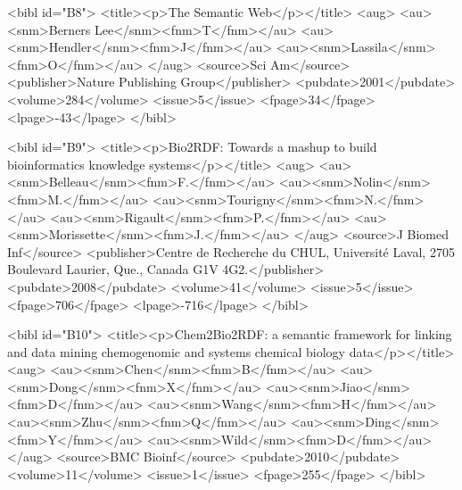 \documentclass[10pt]{bmc_article}
\newenvironment{bmcformat}{\begin{raggedright}\baselineskip20pt\sloppy\setboolean{publ}{false}}{\end{raggedright}\baselineskip20pt\sloppy}
\begin{document}
\begin{bmcformat}
{<bibl id="B8">
  <title><p>The Semantic Web</p></title>
  <aug>
    <au><snm>Berners Lee</snm><fnm>T</fnm></au>
    <au><snm>Hendler</snm><fnm>J</fnm></au>
    <au><snm>Lassila</snm><fnm>O</fnm></au>
  </aug>
  <source>Sci Am</source>
  <publisher>Nature Publishing Group</publisher>
  <pubdate>2001</pubdate>
  <volume>284</volume>
  <issue>5</issue>
  <fpage>34</fpage>
  <lpage>-43</lpage>
</bibl>

<bibl id="B9">
  <title><p>{Bio2RDF}: Towards a mashup to build bioinformatics knowledge
  systems</p></title>
  <aug>
    <au><snm>Belleau</snm><fnm>F.</fnm></au>
    <au><snm>Nolin</snm><fnm>M.</fnm></au>
    <au><snm>Tourigny</snm><fnm>N.</fnm></au>
    <au><snm>Rigault</snm><fnm>P.</fnm></au>
    <au><snm>Morissette</snm><fnm>J.</fnm></au>
  </aug>
  <source>J Biomed Inf</source>
  <publisher>Centre de Recherche du CHUL, Universit\'{e} Laval, 2705 Boulevard
  Laurier, Que., Canada G1V 4G2.</publisher>
  <pubdate>2008</pubdate>
  <volume>41</volume>
  <issue>5</issue>
  <fpage>706</fpage>
  <lpage>-716</lpage>
</bibl>

<bibl id="B10">
  <title><p>{Chem2Bio2RDF}: a semantic framework for linking and data mining
  chemogenomic and systems chemical biology data</p></title>
  <aug>
    <au><snm>Chen</snm><fnm>B</fnm></au>
    <au><snm>Dong</snm><fnm>X</fnm></au>
    <au><snm>Jiao</snm><fnm>D</fnm></au>
    <au><snm>Wang</snm><fnm>H</fnm></au>
    <au><snm>Zhu</snm><fnm>Q</fnm></au>
    <au><snm>Ding</snm><fnm>Y</fnm></au>
    <au><snm>Wild</snm><fnm>D</fnm></au>
  </aug>
  <source>BMC Bioinf</source>
  <pubdate>2010</pubdate>
  <volume>11</volume>
  <issue>1</issue>
  <fpage>255</fpage>
</bibl>

}
\end{bmcformat}
\end{document}
